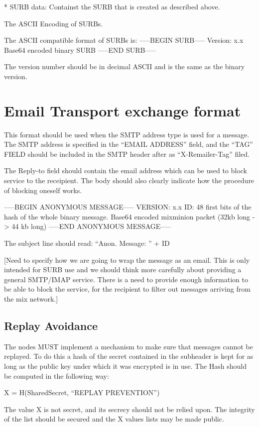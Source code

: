 * SURB data: Containst the SURB that is created as described
  above. 

The ASCII Encoding of SURBs.

The  ASCII compatible format of SURBs is:
-----BEGIN SURB-----
Version: x.x
Base64 encoded binary SURB 
-----END SURB-----

The version number should be in decimal ASCII and is the same as the
binary version.

\section{Email Transport exchange format}

This format should be used when the SMTP address type is used for a
message. The SMTP address is specified in the ``EMAIL ADDRESS'' field,
and the ``TAG'' FIELD should be included in the SMTP header after as
``X-Remailer-Tag'' filed.

The Reply-to field should contain the email address which can be used
to block service to the receipient. The body should also clearly
indicate how the procedure of blocking oneself works.

-----BEGIN ANONYMOUS MESSAGE-----
VERSION: x.x
ID: 48 first bits of the hash of the whole binary message.
Base64 encoded mixminion packet (32kb long -> 44 kb long)
-----END ANONYMOUS MESSAGE-----

The subject line should read: ``Anon. Message: '' + ID

[Need to specify how we are going to wrap the message
 as an email. This is only intended for SURB use and
 we should think more carefully about providing a 
 general SMTP/IMAP service.
 There is a need to provide enough information to be 
 able to block the service, for the recipient to
 filter out messages arriving from the mix network.]

\subsection{Replay Avoidance}

The nodes MUST implement a mechanism to make sure that messages cannot
be replayed. To do this a hash of the secret contained in the
subheader is kept for as long as the public key under which it was
encrypted is in use. The Hash should be computed in the following way:

X = H(SharedSecret, ``REPLAY PREVENTION'')

The value X is not secret, and its secrecy should not be relied upon.
The integrity of the list should be secured and the X values lists may
be made public.


